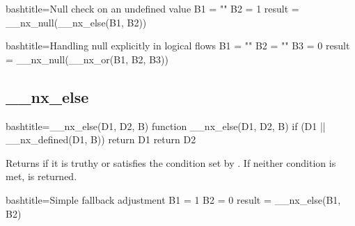\begin{NexCodeBox}{bash}{title={Null check on an undefined value}}
	B1 = ""
	B2 = 1
	result = __nx_null(__nx_else(B1, B2))
\end{NexCodeBox}


\begin{NexCodeBox}{bash}{title={Handling null explicitly in logical flows}}
	B1 = ""
	B2 = ""
	B3 = 0
	result = __nx_null(__nx_or(B1, B2, B3))
\end{NexCodeBox}

\newpage
\subsection{__nx_else}
\label{__nx_else}
\begin{NexCodeBox}{bash}{title={__nx_else(D1, D2, B)}}
function __nx_else(D1, D2, B) {
	if (D1 || __nx_defined(D1, B))
		return D1
	return D2
}
\end{NexCodeBox}

\begin{NexMainBox}
	\begin{NexMainBox}
		Returns  if it is truthy or satisfies the condition set by . If neither condition is met,  is returned.
	\end{NexMainBox}
	\begin{NexMainBox}
		\begin{NexListDark}
		\end{NexListDark}
	\end{NexMainBox}
\end{NexMainBox}

\begin{NexCodeBox}{bash}{title={Simple fallback adjustment}}
	B1 = 1
	B2 = 0
	result = __nx_else(B1, B2)
\end{NexCodeBox}

